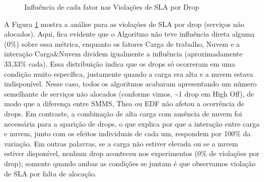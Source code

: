 \begin{figure}[ht!]
    \centering
    \footnotesize

    \caption{Influência de cada fator nas Violações de SLA por Drop}
    \label{fig:influence_drop}
\end{figure}

A Figura \ref{fig:influence_drop} mostra a análise para as violações de SLA por drop (serviços não alocados). Aqui, fica evidente que o Algoritmo não teve influência direta alguma (0\%) sobre essa métrica, enquanto os fatores Carga de trabalho, Nuvem e a interação Carga\&Nuvem dividem igualmente a influência (aproximadamente 33,33\% cada). Essa distribuição indica que os drops só ocorreram em uma condição muito específica, justamente quando a carga era alta e a nuvem estava indisponível. Nesse caso, todos os algoritmos acabaram apresentando um número semelhante de serviços não alocados (conforme vimos, \textasciitilde1 drop em High Off), de modo que a diferença entre SMMS, Thea ou EDF não afetou a ocorrência de drops. Em contraste, a combinação de alta carga com ausência de nuvem foi necessária para a aparição de drops, o que explica por que a interação entre carga e nuvem, junto com os efeitos individuais de cada um, respondem por 100\% da variação. Em outras palavras, se a carga não estiver elevada ou se a nuvem estiver disponível, nenhum drop aconteceu nos experimentos (0\% de violações por drop); somente quando ambas as condições se juntam é que observamos violação de SLA por falta de alocação.


